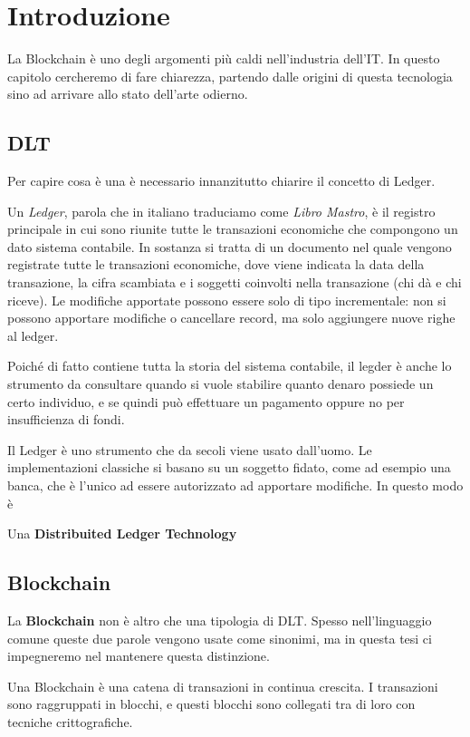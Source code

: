 \chapter{Introduzione}

La Blockchain è uno degli argomenti più caldi nell'industria dell'IT. In questo
capitolo cercheremo di fare chiarezza, partendo dalle origini di questa tecnologia
sino ad arrivare allo stato dell'arte odierno.

\section{DLT}
Per capire cosa è una  è necessario
innanzitutto chiarire il concetto di Ledger.

Un \textit{Ledger}, parola che in italiano traduciamo come \textit{Libro Mastro},
è il registro principale in cui sono riunite tutte le transazioni economiche
che compongono un dato sistema contabile. In sostanza si tratta di un documento
nel quale vengono registrate tutte le transazioni economiche, dove viene
indicata la data della transazione, la cifra scambiata e i soggetti coinvolti
nella transazione (chi dà e chi riceve). Le modifiche apportate possono essere solo
di tipo incrementale: non si possono apportare modifiche o cancellare record,
ma solo aggiungere nuove righe al ledger.

Poiché di fatto contiene tutta la storia del sistema contabile, il legder è anche
lo strumento da consultare quando si vuole stabilire quanto denaro possiede un certo
individuo, e se quindi può effettuare un pagamento oppure no per insufficienza
di fondi.

Il Ledger è uno strumento che da secoli viene usato dall'uomo. Le implementazioni
classiche si basano su un soggetto fidato, come ad esempio una banca, che è
l'unico ad essere autorizzato ad apportare modifiche. In questo modo è

Una \textbf{Distribuited Ledger Technology}

\section{Blockchain}
La \textbf{Blockchain} non è altro che una tipologia di DLT. Spesso nell'linguaggio
comune queste due parole vengono usate come sinonimi, ma in questa tesi ci impegneremo
nel mantenere questa distinzione.

Una Blockchain è una catena di transazioni in continua crescita. I transazioni sono
raggruppati in blocchi, e questi blocchi sono collegati tra di loro con tecniche
crittografiche.

